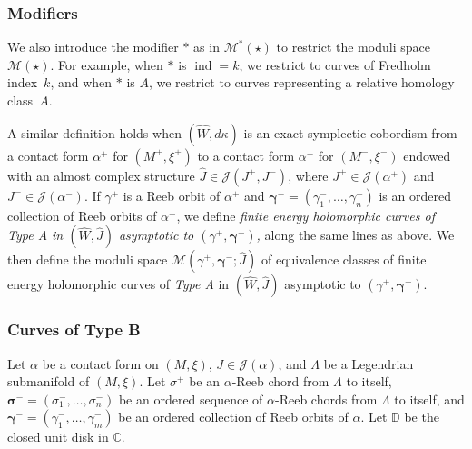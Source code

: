 \documentclass[JEP,XML,SOM,Unicode,NoFloatCountersInSection]{cedram}
\let\mathcal\mathscr
\theoremstyle{plain}
\theoremstyle{definition}
\numberwithin{equation}{subsection}
\newcommand{\CC}{\mathbb{C}}
\let\op\operatorname
\let\bs\boldsymbol
\begin{document}
\subsubsection*{Modifiers}
We also introduce the modifier $\ast$ as in $\mathcal{M}^\ast(\star)$ to restrict the moduli space $\mathcal{M}(\star)$. For example, when $\ast$ is $\op{ind}=k$, we restrict to curves of Fredholm index~$k$, and when $\ast$ is $A$, we restrict to curves representing a relative homology class~$A$.

\smallskip
A similar definition holds when $(\widehat W,d\kappa)$ is an exact symplectic cobordism from a contact form $\alpha^+$ for $(M^+,\xi^+)$ to a contact form $\alpha^-$ for $(M^-,\xi^-)$ endowed with an almost complex structure $\widehat{J}\in \mathcal{J}(J^+,J^-)$, where $J^+ \in \mathcal{J}(\alpha^+)$ and $J^- \in \mathcal{J}(\alpha^-)$. If $\gamma^+$ is a Reeb orbit of $\alpha^+$ and $\bs\gamma^-=(\gamma^-_1,\dots,\gamma^-_n)$ is an ordered collection of Reeb orbits of $\alpha^-$, we define {\em finite energy holomorphic curves of \emph{Type A} in $(\widehat{W},\widehat{J})$ asymptotic to $(\gamma^+,\bs\gamma^-)$,} along the same lines as above. We then define the moduli space ${\mathcal{M}}(\gamma^+,\bs\gamma^-;\widehat{J})$ of equivalence classes of finite energy holomorphic curves of \emph{Type A} in $(\widehat W,\widehat{J})$ asymptotic to $(\gamma^+,\bs\gamma^-)$.

\subsubsection{Curves of {Type B}} \label{subsubsection: B}

Let $\alpha$ be a contact form on $(M,\xi)$, $J\in \mathcal{J}(\alpha)$, and $\Lambda$ be a Legendrian submanifold of $(M,\xi)$. Let $\sigma^+$ be an $\alpha$-Reeb chord from $\Lambda$ to itself, $\bs\sigma^-=(\sigma^-_1,\dots,\sigma^-_n)$ be an ordered sequence of $\alpha$-Reeb chords from $\Lambda$ to itself, and $\bs\gamma^-=(\gamma^-_1,\dots,\gamma^-_m)$ be an ordered collection of Reeb orbits of $\alpha$. Let $\mathbb{D}$ be the closed unit disk in $\CC$.
\end{document}
